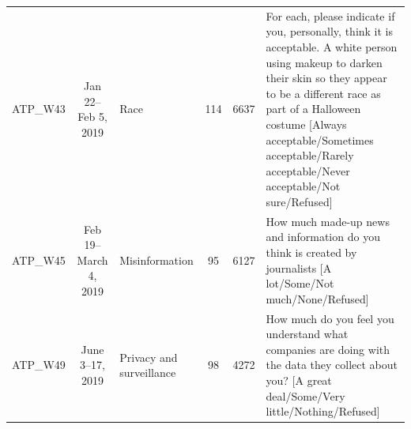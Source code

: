 \begin{table}[t]
\begin{center}
\begin{small}
\begin{tabular}{lcp{1.25cm}ccp{5cm}}
            ATP\_W43  &  Jan 22–Feb 5, 2019   &                     Race &          114 &         6637 & For each, please indicate if you, personally, think it is acceptable. A white person using makeup to darken their skin so they appear to be a different race as part of a Halloween costume [Always acceptable/Sometimes acceptable/Rarely acceptable/Never acceptable/Not sure/Refused] \\
            ATP\_W45  &    Feb 19–March 4, 2019 &           Misinformation &           95 &         6127 &                                                                                                                                                                          How much made-up news and information do you think is created by journalists [A lot/Some/Not much/None/Refused] \\
            ATP\_W49  &  June 3–17, 2019 &    Privacy and surveillance &           98 &         4272 &                                                                                                                                       How much do you feel you understand what companies are doing with the data they collect about you? [A great deal/Some/Very little/Nothing/Refused] \\
        \bottomrule
        \end{tabular}

\end{small}
\end{center}    
\vskip -0.1in
\end{table}

